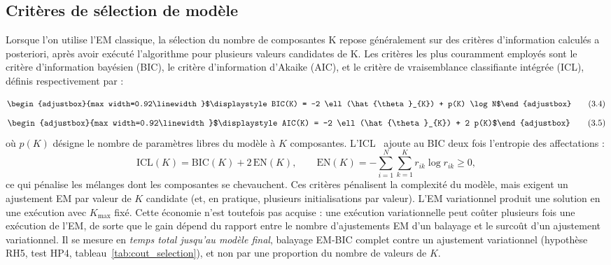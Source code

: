 \subsection{Critères de sélection de modèle}\label{sec:selection_modele}
Lorsque l'on utilise l'EM classique, la sélection du nombre de composantes K repose généralement sur des critères d'information calculés a posteriori, après avoir exécuté l'algorithme pour plusieurs valeurs candidates de K. Les critères les plus couramment employés sont le critère d'information bayésien (BIC), le critère d'information d'Akaike (AIC), et le critère de vraisemblance classifiante intégrée (ICL), définis respectivement par :

\begin{equation}
\begin{adjustbox}{max width=0.92\linewidth}$\displaystyle BIC(K) = -2 \ell (\hat{\theta }_{K}) + p(K) \log N$\end{adjustbox}
\tag{3.4}
\label{eq:2_4}
\end{equation}
\begin{equation}
\begin{adjustbox}{max width=0.92\linewidth}$\displaystyle AIC(K) = -2 \ell (\hat{\theta }_{K}) + 2 p(K)$\end{adjustbox}
\tag{3.5}
\label{eq:2_5}
\end{equation}
où $p(K)$ désigne le nombre de paramètres libres du modèle à $K$ composantes. L'ICL~\cite{biernacki2000} ajoute au BIC deux fois l'entropie des affectations :
\begin{equation}
\mathrm{ICL}(K) = \mathrm{BIC}(K) + 2\,\mathrm{EN}(K), \qquad \mathrm{EN}(K) = -\sum_{i=1}^{N}\sum_{k=1}^{K} r_{ik}\log r_{ik} \geq 0,
\tag{3.5b}
\label{eq:2_5b}
\end{equation}
ce qui pénalise les mélanges dont les composantes se chevauchent. Ces critères pénalisent la complexité du modèle, mais exigent un ajustement EM par valeur de $K$ candidate (et, en pratique, plusieurs initialisations par valeur). L'EM variationnel produit une solution en une exécution avec $K_{\max}$ fixé. Cette économie n'est toutefois pas acquise : une exécution variationnelle peut coûter plusieurs fois une exécution de l'EM, de sorte que le gain dépend du rapport entre le nombre d'ajustements EM d'un balayage et le surcoût d'un ajustement variationnel. Il se mesure en \emph{temps total jusqu'au modèle final}, balayage EM-BIC complet contre un ajustement variationnel (hypothèse RH5, test HP4, tableau~\ref{tab:cout_selection}), et non par une proportion du nombre de valeurs de $K$.

